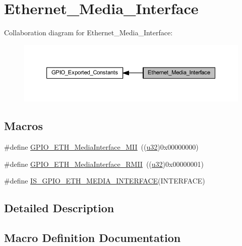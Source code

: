 \hypertarget{group___ethernet___media___interface}{}\section{Ethernet\+\_\+\+Media\+\_\+\+Interface}
\label{group___ethernet___media___interface}
Collaboration diagram for Ethernet\+\_\+\+Media\+\_\+\+Interface\+:
\nopagebreak
\begin{figure}[H]
\begin{center}
\leavevmode
\includegraphics[width=350pt]{group___ethernet___media___interface}
\end{center}
\end{figure}
\subsection*{Macros}
\begin{DoxyCompactItemize}
\item 
\#define \hyperlink{group___ethernet___media___interface_gae11ff25c61c4f22f55118f9f88f6d465}{G\+P\+I\+O\+\_\+\+E\+T\+H\+\_\+\+Media\+Interface\+\_\+\+M\+II}~((\hyperlink{group___exported__types_gafaa62991928fb9fb18ff0db62a040aba}{u32})0x00000000)
\item 
\#define \hyperlink{group___ethernet___media___interface_ga5ee3d057ee58149b1d1abdacfacd4a4e}{G\+P\+I\+O\+\_\+\+E\+T\+H\+\_\+\+Media\+Interface\+\_\+\+R\+M\+II}~((\hyperlink{group___exported__types_gafaa62991928fb9fb18ff0db62a040aba}{u32})0x00000001)
\item 
\#define \hyperlink{group___ethernet___media___interface_gaaba662c046aed61cb28aa10918bfd4c4}{I\+S\+\_\+\+G\+P\+I\+O\+\_\+\+E\+T\+H\+\_\+\+M\+E\+D\+I\+A\+\_\+\+I\+N\+T\+E\+R\+F\+A\+CE}(I\+N\+T\+E\+R\+F\+A\+CE)
\end{DoxyCompactItemize}


\subsection{Detailed Description}


\subsection{Macro Definition Documentation}
\mbox{\label{group___ethernet___media___interface_gae11ff25c61c4f22f55118f9f88f6d465}} 
